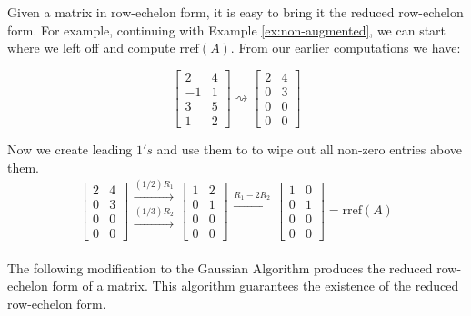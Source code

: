 \documentclass{ximera}
\begin{document}
Given a matrix in row-echelon form, it is easy to bring it the reduced row-echelon form.  For example, continuing with Example \ref{ex:non-augmented}, we can start where we left off and compute $\mbox{rref}(A)$.  From our earlier computations we have:
 
$$\begin{bmatrix}2&4\\-1&1\\3&5\\1&2\end{bmatrix}\rightsquigarrow\begin{bmatrix}2&4\\0&3\\0&0\\0&0\end{bmatrix}$$
 
Now we create leading $1's$ and use them to to wipe out all non-zero entries above them.
$$\begin{bmatrix}2&4\\0&3\\0&0\\0&0\end{bmatrix}
  \begin{array}{c}
    \xrightarrow{(1/2)R_1}\\
  \xrightarrow{(1/3)R_2}\\
  \\
  \\
 \end{array}
\begin{bmatrix}1&2\\0&1\\0&0\\0&0\end{bmatrix}
  \begin{array}{c}
  \xrightarrow{R_1-2R_2}\\
\\
\\
 \\
 \end{array}
\begin{bmatrix}1&0\\0&1\\0&0\\0&0\end{bmatrix}=\mbox{rref}(A)$$
 
The following modification to the Gaussian Algorithm produces the reduced row-echelon form of a matrix.  This algorithm guarantees the existence of the reduced row-echelon form.
\end{document}
